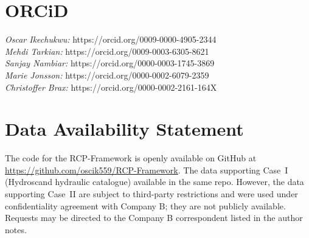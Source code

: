 \documentclass[largeformat]{interact}
\begin{document}
\section*{ORCiD}
\textit{Oscar Ikechukwu:}   https://orcid.org/0009-0000-4905-2344\\
\textit{Mehdi Tarkian:}   https://orcid.org/0009-0003-6305-8621\\
\textit{Sanjay Nambiar:}   https://orcid.org/0000-0003-1745-3869\\
\textit{Marie Jonsson:}  https://orcid.org/0000-0002-6079-2359\\
\textit{Christoffer Brax:}  https://orcid.org/0000-0002-2161-164X

\section*{Data Availability Statement}
 The code for the RCP-Framework is openly available on GitHub at \url{https://github.com/oscik559/RCP-Framework}.
The data supporting Case~I (Hydroscand hydraulic catalogue) available in the same repo. However, the data supporting Case~II are subject to third-party restrictions and were used under confidentiality agreement with Company B; they are not publicly available. Requests may be directed to the Company B correspondent listed in the author notes.



\clearpage
\appendix
\renewcommand{\thesection}{\Alph{section}}
\renewcommand{\thesubsection}{\thesection.\arabic{subsection}}
\renewcommand{\thetable}{\thesection.\arabic{table}}
\setcounter{section}{0}
\end{document}
